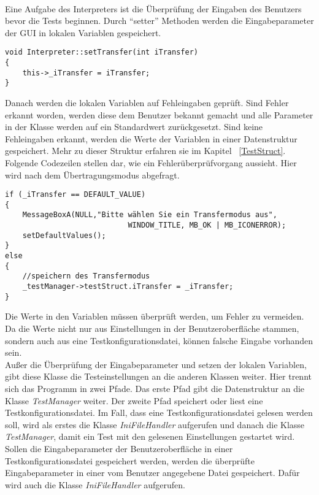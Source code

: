 \paragraph{}
Eine Aufgabe des Interpreters ist die Überprüfung der Eingaben des Benutzers bevor die Tests beginnen. Durch "`setter"' Methoden werden die Eingabeparameter der GUI in lokalen Variablen gespeichert.\\


\begin{lstlisting}	 
void Interpreter::setTransfer(int iTransfer)
{
	this->_iTransfer = iTransfer;
}
\end{lstlisting}

Danach werden die lokalen Variablen auf Fehleingaben geprüft. Sind Fehler erkannt worden, werden diese dem Benutzer bekannt gemacht und alle Parameter in der Klasse werden auf ein Standardwert zurückgesetzt. Sind keine Fehleingaben erkannt, werden die Werte der Variablen in einer Datenstruktur gespeichert. Mehr zu dieser Struktur erfahren sie im Kapitel ~\ref{TestStruct}. Folgende Codezeilen stellen dar, wie ein Fehlerüberprüfvorgang aussieht. Hier wird nach dem Übertragungsmodus abgefragt.

\begin{lstlisting}	 
if (_iTransfer == DEFAULT_VALUE)
{
	MessageBoxA(NULL,"Bitte wählen Sie ein Transfermodus aus",
							WINDOW_TITLE, MB_OK | MB_ICONERROR);
	setDefaultValues();
}
else
{
	//speichern des Transfermodus
	_testManager->testStruct.iTransfer = _iTransfer;
}
\end{lstlisting}

Die Werte in den Variablen müssen überprüft werden, um Fehler zu vermeiden. Da die Werte nicht nur aus Einstellungen in der Benutzeroberfläche stammen, sondern auch aus eine Testkonfigurationsdatei, können falsche Eingabe vorhanden sein.\\

Außer die Überprüfung der Eingabeparameter und setzen der lokalen Variablen, gibt diese Klasse die Testeinstellungen an die anderen Klassen weiter. Hier trennt sich das Programm in zwei Pfade. Das erste Pfad gibt die Datenstruktur an die Klasse \textit{TestManager} weiter. Der zweite Pfad speichert oder liest eine Testkonfigurationsdatei. Im Fall, dass eine Testkonfigurationsdatei gelesen werden soll, wird als erstes die Klasse \textit{IniFileHandler} aufgerufen und danach die Klasse \textit{TestManager}, damit ein Test mit den gelesenen Einstellungen gestartet wird. Sollen die Eingabeparameter der Benutzeroberfläche in einer Testkonfigurationsdatei gespeichert werden, werden die überprüfte Eingabeparameter in einer vom Benutzer angegebene Datei gespeichert. Dafür wird auch die Klasse \textit{IniFileHandler} aufgerufen.\\

